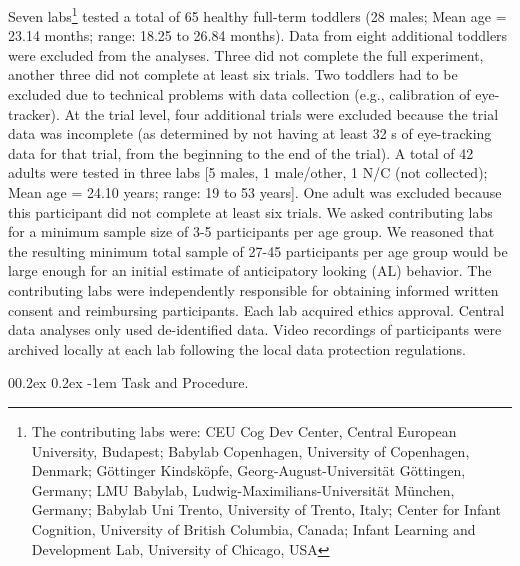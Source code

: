 \documentclass[
  man, donotrepeattitle,floatsintext]{apa6}
\makeatletter
\let\oldparagraph\paragraph
\renewcommand{\paragraph}{
    \@ifstar
      \xxxParagraphStar
      \xxxParagraphNoStar
  }
\newcommand{\xxxParagraphStar}[1]{\oldparagraph*{#1}\mbox{}}
\newcommand{\xxxParagraphNoStar}[1]{\oldparagraph{#1}\mbox{}}
\renewcommand{\paragraph}{\@startsection{paragraph}{4}{\parindent}%
  {0\baselineskip \@plus 0.2ex \@minus 0.2ex}%
  {-1em}%
  {\normalfont\normalsize\bfseries\itshape\typesectitle}}
\makeatother
\begin{document}
Seven labs\footnote{The contributing labs were: CEU Cog Dev Center, Central European University, Budapest; Babylab Copenhagen, University of Copenhagen, Denmark; Göttinger Kindsköpfe, Georg-August-Universität Göttingen, Germany; LMU Babylab, Ludwig-Maximilians-Universität München, Germany; Babylab Uni Trento, University of Trento, Italy; Center for Infant Cognition, University of British Columbia, Canada; Infant Learning and Development Lab, University of Chicago, USA} tested a total of 65 healthy full-term toddlers (28 males; Mean age = 23.14 months; range: 18.25 to 26.84 months). Data from eight additional toddlers were excluded from the analyses. Three did not complete the full experiment, another three did not complete at least six trials. Two toddlers had to be excluded due to technical problems with data collection (e.g., calibration of eye-tracker). At the trial level, four additional trials were excluded because the trial data was incomplete (as determined by not having at least 32 s of eye-tracking data for that trial, from the beginning to the end of the trial). A total of 42 adults were tested in three labs {[}5 males, 1 male/other, 1 N/C (not collected); Mean age = 24.10 years; range: 19 to 53 years{]}. One adult was excluded because this participant did not complete at least six trials. We asked contributing labs for a minimum sample size of 3-5 participants per age group. We reasoned that the resulting minimum total sample of 27-45 participants per age group would be large enough for an initial estimate of anticipatory looking (AL) behavior. The contributing labs were independently responsible for obtaining informed written consent and reimbursing participants. Each lab acquired ethics approval. Central data analyses only used de-identified data. Video recordings of participants were archived locally at each lab following the local data protection regulations.

\paragraph{Task and Procedure.}\label{task-and-procedure.}
\end{document}
